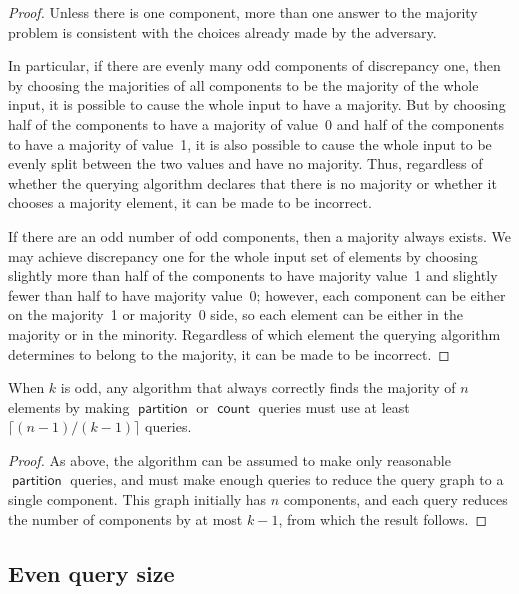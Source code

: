 \documentclass[11pt]{llncs}
\newcommand{\qcount}{\operatorname{\mathsf{count}}}
\newcommand{\qpart}{\operatorname{\mathsf{partition}}}
\begin{document}
\begin{proof}
Unless there is one component, more than one answer to the majority problem  is consistent with the choices already made by the adversary.

In particular, if there are evenly many odd components of discrepancy one, then by choosing the majorities of all components to be the majority of the whole input, it is possible to cause the whole input to have a majority. But by choosing half of the components to have a majority of value~0 and half of the components to have a majority of value~1, it is also possible to cause the whole input to be evenly split between the two values and have no majority. Thus, regardless of whether the querying algorithm declares that there is no majority or whether it chooses a majority element, it can be made to be incorrect.

If there are an odd number of odd components, then a majority always exists. We may achieve discrepancy one for the whole input set of elements by choosing slightly more than half of the components to have majority value~1 and slightly fewer than half to have majority value~0; however, each component can be either on the majority~1 or majority~0 side, so each element can be either in the majority or in the minority. Regardless of which element the querying algorithm determines to belong to the majority, it can be made to be incorrect.
\end{proof}

\begin{theorem}
\label{thm:odd-lb}
When $k$ is odd, any algorithm that always correctly finds the majority of $n$ elements by making $\qpart$ or $\qcount$ queries must use at least $\lceil (n-1)/(k-1)\rceil$ queries.
\end{theorem}

\begin{proof}
As above, the algorithm can be assumed to make only reasonable $\qpart$ queries, and must make enough queries to reduce the query graph to a single component. This graph initially has $n$ components, and each query reduces the number of components by at most $k-1$, from which the result follows.
\end{proof}

\ifFull
\subsection{Even query size}
\fi
\end{document}
